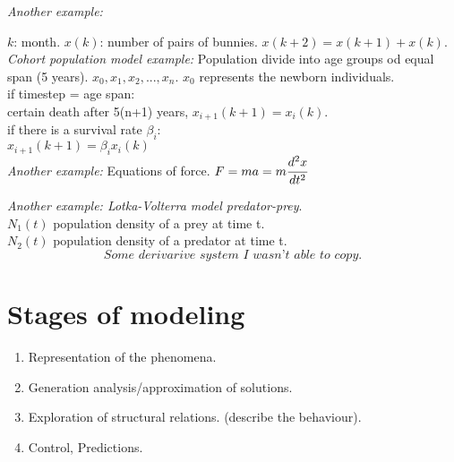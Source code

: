 \documentclass[a4paper,12pt]{article}
\begin{document}
        \textit{Another example:}

        $k$: month. $x(k)$: number of pairs of bunnies.
        $x(k + 2) = x(k + 1) + x(k)$.\\

        \textit{Cohort population model example:} Population divide into age 
        groups od equal span (5 years). $x_{0}, x_{1}, x_{2}, ..., x_{n}$.
        $x_{0}$ represents the newborn individuals.\\
        
        if timestep = age span:\\
        certain death after 5(n+1) years, $x_{i+1}(k+1) = x_{i}(k)$.\\

        if there is a survival rate $\beta_{i}$:\\
        $x_{i+1}(k+1) = \beta_{i} x_{i}(k)$\\

        \textit{Another example:}
        Equations of force. $F = ma = m \cfrac{d^2 x}{dt^2}$


        \textit{Another example: Lotka-Volterra model predator-prey}.\\
        $N_{1}(t)$ population density of a prey at time t.\\
        $N_{2}(t)$ population density of a predator at time t.\\

        \begin{equation}
            \textit{Some derivarive system I wasn't able to copy.}
        \end{equation}

        \section{Stages of modeling}

            \begin{enumerate}
                \item Representation of the phenomena.
                \item Generation analysis/approximation of solutions.
                \item Exploration of structural relations. (describe the 
                    behaviour).
                \item Control, Predictions.
            \end{enumerate}

    
\end{document}
